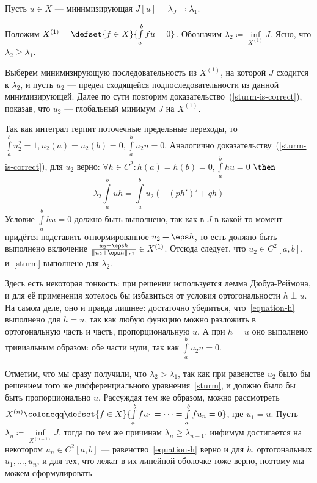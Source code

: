 \documentclass[a4paper]{article}
\begin{document}
    Пусть $u \in X$ --- минимизирующая $J[u] = \lambda_J \eqqcolon \lambda_1$.

    Положим $X^{(1)} = \defset{f \in X}{\int\limits_a^b{fu} = 0}$.
    Обозначим $\lambda_2 \coloneqq \inf\limits_{X^{(1)}}J$.
    Ясно, что $\lambda_2 \ge \lambda_1$.

    Выберем минимизирующую последовательность из $X^{(1)}$, на которой $J$ сходится к $\lambda_2$, и пусть $u_2$ --- предел сходящейся подпоследовательности из данной минимизирующей.
    Далее по сути повторим доказательство~(\cref{sturm-is-correct}), показав, что $u_2$ --- глобальный минимум $J$ на $X^{(1)}$.

    Так как интеграл терпит поточечные предельные переходы, то $\int\limits_{a}^{b}u_2^2 = 1, u_2(a) = u_2(b) = 0, {\int\limits_{a}^{b}u_2 u = 0}$.
    Аналогично доказательству~(\cref{sturm-is-correct}), для $u_2$ верно: $\forall h \in C^2: h(a) = h(b) = 0, \int\limits_{a}^{b}hu = 0$ $\then$ \[\lambda_2 \int\limits_{a}^{b}uh = \int\limits_{a}^{b}u_2 (-(ph')' + qh)\label{equation-h}\tag{$**$}\]
    Условие $\int\limits_{a}^{b}hu = 0$ должно быть выполнено, так как в $J$ в какой-то момент придётся подставить отнормированное $u_2 + \eps h$, то есть должно быть выполнено включение $\frac{u_2 + \eps h}{\|u_2 + \eps h\|_{L^2}} \in X^{(1)}$.
    Отсюда следует, что $u_2 \in C^2[a, b]$, и~\eqref{sturm} выполнено для $\lambda_2$.

    Здесь есть некоторая тонкость: при решении используется лемма Дюбуа-Реймона, и для её применения хотелось бы избавиться от условия ортогональности $h \perp u$.
    На самом деле, оно и правда лишнее: достаточно убедиться, что~\eqref{equation-h} выполнено для $h = u$, так как любую функцию можно разложить в ортогональную часть и часть, пропорциональную $u$.
    А при $h = u$ оно выполнено тривиальным образом: обе части нули, так как $\int\limits_{a}^{b}u_2 u = 0$.

    Отметим, что мы сразу получили, что $\lambda_2 > \lambda_1$, так как при равенстве $u_2$ было бы решением того же дифференциального уравнения~\eqref{sturm}, и должно было бы быть пропорционально $u$.
    Рассуждая тем же образом, можно рассмотреть $X^{(n)} \coloneqq \defset{f \in X}{\int\limits_{a}^{b}fu_1 = \dots = \int\limits_{a}^{b}fu_{n} = 0}$, где $u_1 = u$.
    Пусть $\lambda_n \coloneqq \inf\limits_{X^{(n-1)}}J$, тогда по тем же причинам $\lambda_n \ge \lambda_{n-1}$, инфимум достигается на некотором $u_n \in C^2[a, b]$ --- равенство~\eqref{equation-h} верно и для $h$, ортогональных $u_1, \dots, u_n$, и для тех, что лежат в их линейной оболочке тоже верно, поэтому мы можем сформулировать
\end{document}
